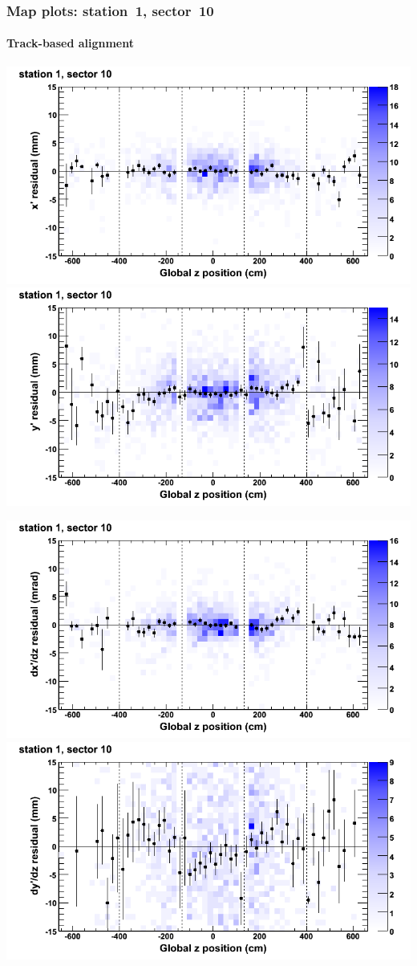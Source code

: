 \documentclass[compress]{beamer}
\begin{document}
\begin{frame}
\frametitle{Map plots: station~1, sector~10}
\framesubtitle{Track-based alignment}
\includegraphics[width=0.5\linewidth]{mapplots_re05/DTvsz_st1sec10_x.png}
\includegraphics[width=0.5\linewidth]{mapplots_re05/DTvsz_st1sec10_y.png}

\includegraphics[width=0.5\linewidth]{mapplots_re05/DTvsz_st1sec10_dxdz.png}
\includegraphics[width=0.5\linewidth]{mapplots_re05/DTvsz_st1sec10_dydz.png}
\end{frame}
\end{document}
